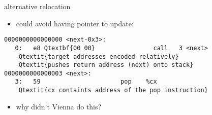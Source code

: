 
\begin{frame}[fragile,label=altVirusReloc]{alternative relocation}
    \begin{itemize}
    \item could avoid having pointer to update:
    \end{itemize}
\begin{Verbatim}[fontsize=\fontsize{10}{11}\selectfont,commandchars=Q\{\}]
0000000000000000 <next-0x3>:
   0:   e8 Qtextbf{00 00}                call   3 <next>
    Qtextit{target addresses encoded relatively}
    Qtextit{pushes return address (next) onto stack}
0000000000000003 <next>:
   3:   59                      pop    %cx
    Qtextit{cx containts address of the pop instruction}
\end{Verbatim}
    \begin{itemize}
    \item why didn't Vienna do this?
    \end{itemize}
\end{frame}

